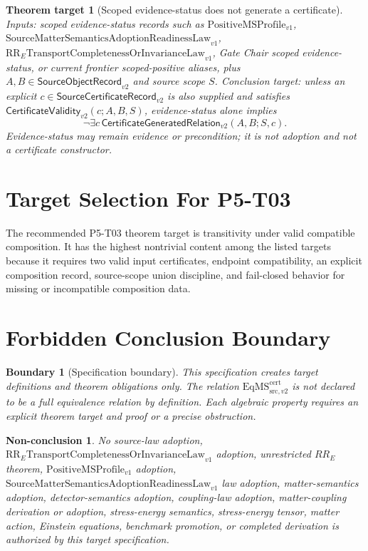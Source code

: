 \documentclass[11pt]{article}
\newcommand{\ObjRec}{\mathsf{SourceObjectRecord}_{v2}}
\newcommand{\CertRec}{\mathsf{SourceCertificateRecord}_{v2}}
\newcommand{\ValidTwo}{\mathsf{CertificateValidity}_{v2}}
\newcommand{\GenRel}{\mathsf{CertificateGeneratedRelation}_{v2}}
\newcommand{\EqMSTwo}{\mathrm{EqMS}^{\mathrm{cert}}_{\mathrm{src},v2}}
\newcommand{\RRELaw}{\mathrm{RR}_{E}\mathrm{TransportCompletenessOrInvarianceLaw}_{v1}}
\newcommand{\PositiveMSProfile}{\mathrm{PositiveMSProfile}_{v1}}
\newcommand{\SMSAR}{\mathrm{SourceMatterSemanticsAdoptionReadinessLaw}_{v1}}
\newtheorem{target}{Theorem target}
\newtheorem{boundary}{Boundary}
\newtheorem{nonconclusion}{Non-conclusion}
\begin{document}
\begin{target}[Scoped evidence-status does not generate a certificate]
Inputs: scoped evidence-status records such as \(\PositiveMSProfile\),
\(\SMSAR\), \(\RRELaw\), Gate Chair scoped evidence-status, or current
frontier scoped-positive aliases, plus \(A,B\in\ObjRec\) and source scope
\(S\). Conclusion target: unless an explicit \(c\in\CertRec\) is also
supplied and satisfies \(\ValidTwo(c;A,B,S)\), evidence-status alone implies
\[
  \neg \exists c\,\GenRel(A,B;S,c).
\]
Evidence-status may remain evidence or precondition; it is not adoption and
not a certificate constructor.
\end{target}

\section{Target Selection For P5-T03}

The recommended P5-T03 theorem target is transitivity under valid compatible
composition. It has the highest nontrivial content among the listed targets
because it requires two valid input certificates, endpoint compatibility, an
explicit composition record, source-scope union discipline, and fail-closed
behavior for missing or incompatible composition data.

\section{Forbidden Conclusion Boundary}

\begin{boundary}[Specification boundary]
This specification creates target definitions and theorem obligations only.
The relation \(\EqMSTwo\) is not declared to be a full equivalence relation by
definition. Each algebraic property requires an explicit theorem target and
proof or a precise obstruction.
\end{boundary}

\begin{nonconclusion}
No source-law adoption, \(\RRELaw\) adoption, unrestricted \(RR_E\) theorem,
\(\PositiveMSProfile\) adoption, \(\SMSAR\) law adoption, matter-semantics
adoption, detector-semantics adoption, coupling-law adoption, matter-coupling
derivation or adoption, stress-energy semantics, stress-energy tensor, matter
action, Einstein equations, benchmark promotion, or completed derivation is
authorized by this target specification.
\end{nonconclusion}
\end{document}
